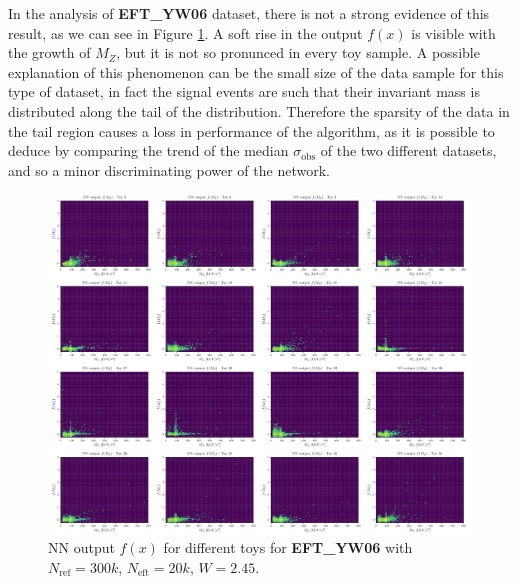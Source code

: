 In the analysis of \textbf{EFT\_YW06} dataset, there is not a strong evidence of this result, as we can see in Figure \ref{fig:F_PLOT_Z_EFT}. A soft rise in the output $f(x)$ is visible with the growth of $M_{Z}$, but it is not so pronunced in every toy sample. A possible explanation of this phenomenon can be the small size of the data sample for this type of dataset, in fact the signal events are such that their invariant mass is distributed along the tail of the distribution. Therefore the sparsity of the data in the tail region causes a loss in performance of the algorithm, as it is possible to deduce by comparing the trend of the median $\sigma_\mathrm{obs}$ of the two different datasets, and so a minor discriminating power of the network.

\begin{figure}[H]
	\centering
	\includegraphics[width=1.0\textwidth]{Python/RESULTS/INV_MASS/f_plot_Zeft.pdf}
	\caption{NN output $f(x)$ for different toys for \textbf{EFT\_YW06} with $N_\mathrm{ref}=300\si{k}$, $N_\mathrm{eft}=20\si{k}$, $W=2.45$.}
	\label{fig:F_PLOT_Z_EFT}
\end{figure}




